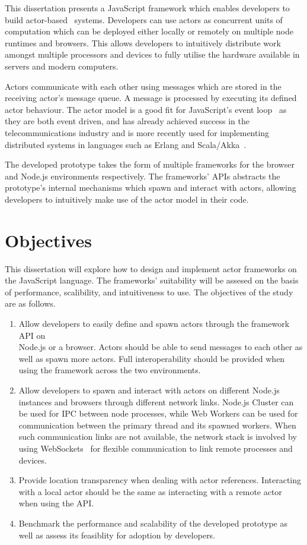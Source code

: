 \documentclass[lettersize,journal]{IEEEtran}
\begin{document}
This dissertation presents a JavaScript framework which enables developers to build actor-based~\cite{hewitt1973session, 43years} systems. Developers can use actors as concurrent units of computation which can be deployed either locally or remotely on multiple node runtimes and browsers. This allows developers to intuitively distribute work amongst multiple processors and devices to fully utilise the hardware available in servers and modern computers.

Actors communicate with each other using messages which are stored in the receiving actor's message queue. A message is processed by executing its defined actor behaviour. The actor model is a good fit for JavaScript's event loop~\cite{eventloopbrowser, eventloopnode} as they are both event driven, and has already achieved success in the telecommunications industry and is more recently used for implementing distributed systems in languages such as Erlang and Scala/Akka~\cite{haller2012integration}.

The developed prototype takes the form of multiple frameworks for the browser and Node.js environments respectively. The frameworks' APIs abstracts the prototype's internal mechanisms which spawn and interact with actors, allowing developers to intuitively make use of the actor model in their code.
\section{Objectives}
This dissertation will explore how to design and implement actor frameworks on the JavaScript language. The frameworks' suitability will be assesed on the basis of performance, scalibility, and intuitiveness to use. The objectives of the study are as follows.
\begin{enumerate}
    \item Allow developers to easily define and spawn actors through the framework API on \\Node.js or a browser. Actors should be able to send messages to each other as well as spawn more actors. Full interoperability should be provided when using the framework across the two environments.
    \item Allow developers to spawn and interact with actors on different Node.js instances and browsers through different network links. Node.js Cluster\cite{cluster} can be used for IPC between node processes, while Web Workers\cite{webworkers} can be used for communication between the primary thread and its spawned workers. When such communication links are not available, the network stack is involved by using WebSockets~\cite{websocket} for flexible communication to link remote processes and devices.
    \item Provide location transparency when dealing with actor references. Interacting with a local actor should be the same as interacting with a remote actor when using the API.
    \item Benchmark the performance and scalability of the developed prototype as well as assess its feasiblity for adoption by developers.
\end{enumerate}
\end{document}
